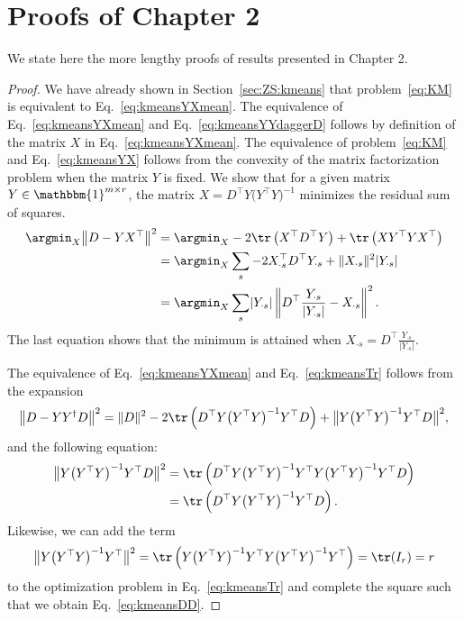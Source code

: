 \chapter{Proofs of Chapter 2}\label{chap:AppendixZS}
We state here the more lengthy proofs of results presented in Chapter 2.
\kmeansobj*
\begin{proof}
We have already shown in Section~\ref{sec:ZS:kmeans} that problem~\eqref{eq:KM} is equivalent to Eq.~\eqref{eq:kmeansYXmean}. The equivalence of Eq.~\eqref{eq:kmeansYXmean} and Eq.~\eqref{eq:kmeansYYdaggerD} follows by definition of the matrix $X$ in Eq.~\eqref{eq:kmeansYXmean}.
The equivalence of problem~\eqref{eq:KM} and Eq.~\eqref{eq:kmeansYX} follows from the convexity of the matrix factorization problem when the matrix $Y$ is fixed. We show that for a given matrix $Y\in\mathbbm{1}^{m\times r}$, the matrix $X=D^\top Y\bigl(Y^\top Y\bigr)^{-1}$
minimizes the residual sum of squares.
\begin{align}
\argmin_X \bigl\lVert D-YX^\top\bigr\rVert ^2 
&= \argmin_X -2\tr\left(X^\top D^\top Y\right) + \tr\left(XY^\top Y X^\top\right)\nonumber\\
&= \argmin_X\sum_s -2X_{\cdot s}^\top D^\top Y_{\cdot s} +\lVert X_{\cdot s}\rVert ^2\lvert Y_{\cdot s}\rvert \nonumber\\
	&= \argmin_X\sum_s \lvert Y_{\cdot s}\rvert \left\lVert D^\top \frac{Y_{\cdot s}}{\lvert Y_{\cdot s}\rvert }-X_{\cdot s}\right\rVert ^2. \label{eq:proofKMeansX}
\end{align}
The last equation shows that the minimum is attained when $X_{\cdot s}=D^\top \frac{Y_{\cdot s}}{\lvert Y_{\cdot s}\rvert }$. 

The equivalence of Eq.~\eqref{eq:kmeansYXmean} and Eq.~\eqref{eq:kmeansTr} follows from the expansion 
\begin{align*}
\bigl\lVert D-YY^\dagger D\bigr\rVert ^2 =  \lVert D\rVert ^2 -2\tr\left(D^\top Y\bigl(Y^\top Y\bigr)^{-1}Y^\top D\right) +\bigl\lVert Y \bigl(Y^\top Y\bigr)^{-1}Y^\top D\bigr\rVert ^2,
\end{align*}
and the following equation:
\begin{align*}
\bigl\lVert Y \bigl(Y^\top Y\bigr)^{-1}Y^\top D\bigr\rVert ^2&= \tr\left(D^\top Y\bigl(Y^\top Y\bigr)^{-1}Y^\top Y \bigl(Y^\top Y\bigr)^{-1}Y^\top D\right)\\
&=\tr\left(D^\top Y\bigl(Y^\top Y\bigr)^{-1}Y^\top D\right).
\end{align*}
Likewise, we can add the term 
\begin{align*}
\bigl\lVert Y\bigl(Y^\top Y\bigr)^{-1}Y^\top\bigr\rVert ^2 = \tr\left(Y\bigl(Y^\top Y\bigr)^{-1}Y^\top Y\bigl(Y^\top Y\bigr)^{-1}Y^\top\right) = \tr(I_r)=r 
\end{align*}
to the optimization problem in Eq.~\eqref{eq:kmeansTr} and complete the square such that we obtain Eq.~\eqref{eq:kmeansDD}.
\end{proof}

